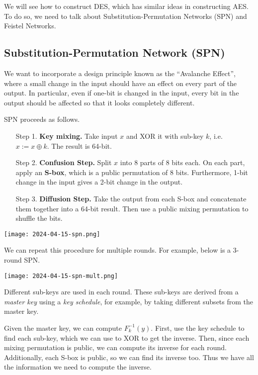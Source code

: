 We will see how to construct DES, which has similar ideas in constructing AES. To do so, we need to talk about Substitution-Permutation Networks (SPN) and Feistel Networks.

\subsection{Substitution-Permutation Network (SPN)}

We want to incorporate a design principle known as the ``Avalanche Effect'', where a small change in the input should have an effect on every part of the output. In particular, even if one-bit is changed in the input, every bit in the output should be affected so that it looks completely different.

SPN proceeds as follows.

\begin{enumerate}
    \item[Step 1.] \textbf{Key mixing.} Take input $x$ and XOR it with sub-key $k$, i.e. $x:= x \oplus k$. The result is 64-bit.
    \item[Step 2.] \textbf{Confusion Step.} Split $x$ into $8$ parts of 8 bits each. On each part, apply an \textbf{S-box}, which is a public permutation of 8 bits. Furthermore, 1-bit change in the input gives a 2-bit change in the output.
    \item[Step 3.] \textbf{Diffusion Step.} Take the output from each S-box and concatenate them together into a 64-bit result. Then use a public mixing permutation to shuffle the bits.
\end{enumerate}

\begin{center}
    \texttt{[image: 2024-04-15-spn.png]}
\end{center}

We can repeat this procedure for multiple rounds. For example, below is a 3-round SPN.

\begin{center}
    \texttt{[image: 2024-04-15-spn-mult.png]}
\end{center}

Different sub-keys are used in each round. These sub-keys are derived from a \textit{master key} using a \textit{key schedule}, for example, by taking different subsets from the master key.

Given the master key, we can compute $F_{k}^{-1}(y)$. First, use the key schedule to find each sub-key, which we can use to XOR to get the inverse. Then, since each mixing permutation is public, we can compute its inverse for each round. Additionally, each S-box is public, so we can find its inverse too. Thus we have all the information we need to compute the inverse.

